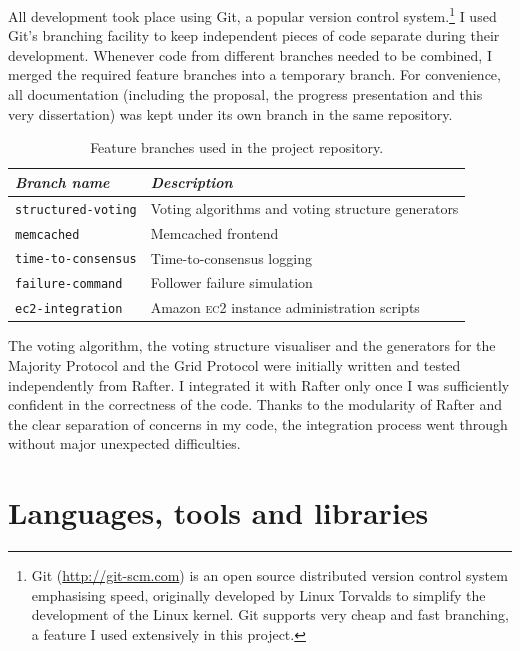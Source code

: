 \documentclass[12pt,chapterprefix=true,toc=bibliography,numbers=noendperiod,
               footnotes=multiple,twoside]{scrreprt}
\newcommand{\ECC}[0]{\textsc{ec}2}
\begin{document}
All development took place using Git, a popular version control system.\footnote{Git (\url{http://git-scm.com}) is an open source distributed version control system emphasising speed, originally developed by Linux Torvalds to simplify the development of the Linux kernel. Git supports very cheap and fast branching, a feature I used extensively in this project.} I used Git's branching facility to keep independent pieces of code separate during their development. Whenever code from different branches needed to be combined, I merged the required feature branches into a temporary branch. For convenience, all documentation (including the proposal, the progress presentation and this very dissertation) was kept under its own branch in the same repository.

\begin{table}[h]
    \centering
    \begin{tabularx}{\textwidth}{l X}
        \toprule
        \textit{Branch name} & \textit{Description} \\
        \midrule
        \texttt{structured-voting} & Voting algorithms and voting structure generators \\
        \texttt{memcached} & Memcached frontend \\
        \texttt{time-to-consensus} & Time-to-consensus logging \\
        \texttt{failure-command} & Follower failure simulation \\
        \texttt{ec2-integration} & Amazon \ECC{} instance administration scripts \\
        \bottomrule
    \end{tabularx}
    \caption{Feature branches used in the project repository.}
    \label{tab:branches}
\end{table}

The voting algorithm, the voting structure visualiser and the generators for the Majority Protocol and the Grid Protocol were initially written and tested independently from Rafter. I integrated it with Rafter only once I was sufficiently confident in the correctness of the code. Thanks to the modularity of Rafter and the clear separation of concerns in my code, the integration process went through without major unexpected difficulties.

\section{Languages, tools and libraries}
\label{sc:tools}
\end{document}
